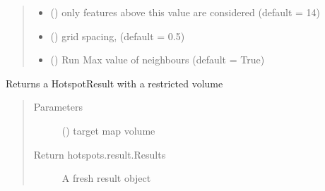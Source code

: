 \documentclass[letterpaper,10pt,english]{sphinxmanual}
\begin{document}
\begin{fulllineitems}
\begin{fulllineitems}
\begin{quote}
\begin{description}
\begin{itemize}
\item {} 
 () \textendash{} only features above this value are considered (default = 14)

\item {} 
 () \textendash{} grid spacing, (default = 0.5)

\item {} 
 () \textendash{} Run Max value of neighbours (default = True)

\end{itemize}

\end{description}\end{quote}

\end{fulllineitems}


\begin{fulllineitems}
\label{\detokenize{result_api:hotspots.result.Extractor.extract_volume}}
Returns a HotspotResult with a restricted volume
\begin{quote}\begin{description}
\item[{Parameters}] \leavevmode
{} () \textendash{} target map volume

\item[{Return hotspots.result.Results}] \leavevmode
A fresh result object

\end{description}\end{quote}

\end{fulllineitems}


\end{fulllineitems}

\end{document}
